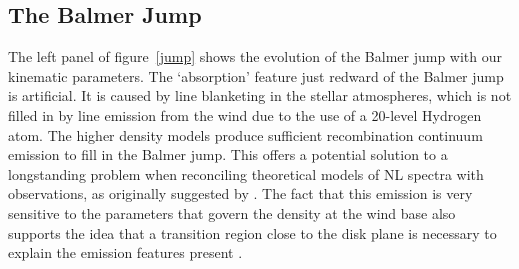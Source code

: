 \documentclass[preprint, a4paper, 11pt]{aastex}
\begin{document}
\subsection{The Balmer Jump}

\label{balmerjump}

The left panel of figure~\ref{jump} shows the evolution
of the Balmer jump with our kinematic parameters. 
The `absorption' feature just redward of the Balmer jump
is artificial. It is caused by line blanketing in the stellar atmospheres,
which is not filled in by line emission from the wind
due to the use of a 20-level Hydrogen atom.
The higher density models
produce sufficient recombination continuum emission to fill 
in the Balmer jump. This offers a potential solution to a 
longstanding problem when reconciling theoretical
models of NL spectra with observations, as originally suggested by
\cite{KLWB98}. The fact that this emission is very sensitive to the parameters
that govern the density at the wind base also supports
the idea that a transition region close to the disk plane is necessary
to explain the emission features present \citep{kd1997}.


\end{document}
